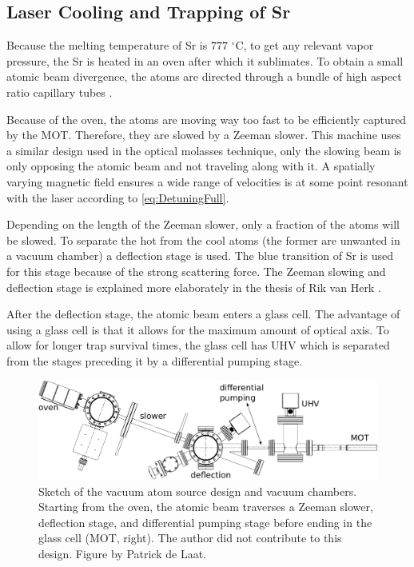 \subsection{Laser Cooling and Trapping of Sr}

Because the melting temperature of Sr is $777$ ${}^{\circ}$C, to get any relevant vapor pressure, the Sr is heated in an oven after which it sublimates. 
To obtain a small atomic beam divergence, the atoms are directed through a bundle of high aspect ratio capillary tubes \cite{Stellmer2013}. 

Because of the oven, the atoms are moving way too fast to be efficiently captured by the MOT.
Therefore, they are slowed by a Zeeman slower. 
This machine uses a similar design used in the optical molasses technique, only the slowing beam is only opposing the atomic beam and not traveling along with it. 
A spatially varying magnetic field ensures a wide range of velocities is at some point resonant with the laser according to \cref{eq:DetuningFull}. 

Depending on the length of the Zeeman slower, only a fraction of the atoms will be slowed.
To separate the hot from the cool atoms (the former are unwanted in a vacuum chamber) a deflection stage is used. 
The blue transition of Sr is used for this stage because of the strong scattering force. 
The Zeeman slowing and deflection stage is explained more elaborately in the thesis of Rik van Herk \cite{Herk2022}.

After the deflection stage, the atomic beam enters a glass cell.
The advantage of using a glass cell is that it allows for the maximum amount of optical axis.
To allow for longer trap survival times, the glass cell has \ac{UHV} which is separated from the stages preceding it by a differential pumping stage. 

\begin{figure}
	\centering
	\includegraphics[width=0.8\linewidth]{figures/SrLoading.pdf}
	\caption{Sketch of the vacuum atom source design and vacuum chambers. 
	Starting from the oven, the atomic beam traverses a Zeeman slower, deflection stage, and differential pumping stage before ending in the glass cell (MOT, right). 
	The author did not contribute to this design. 
	Figure by Patrick de Laat.}
	\label{fig:SrLoading}
\end{figure}


